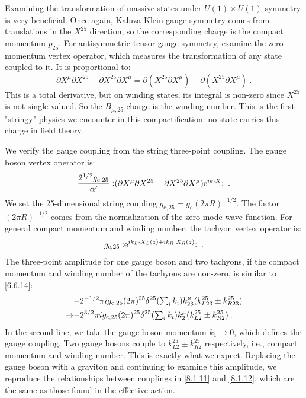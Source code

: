 Examining the transformation of massive states under $U(1) \times U(1)$ symmetry is very beneficial.
Once again, Kaluza-Klein gauge symmetry comes from translations in the $X^{25}$ direction, 
so the corresponding charge is the compact momentum $p_{25} $. For antisymmetric tensor gauge symmetry, examine the zero-momentum vertex operator, which measures the transformation of any state coupled to it.
It is proportional to:
\begin{equation}
	\partial X^{\mu} \bar{\partial} X^{25}-\partial X^{25} \bar{\partial} X^{\mu}= 
	\bar{\partial}(X^{25} \partial X^{\mu})-\partial(X^{25} \bar{\partial} X^{\mu}) \:. \label{8.3.4}
\end{equation}
This is a total derivative, but on winding states, its integral is non-zero since $X^{25}$ is not single-valued. So the $B_{\mu, 25}$ charge is the winding number.
This is the first "stringy" physics we encounter in this compactification: no state carries this charge in field theory.

We verify the gauge coupling from the string three-point coupling. The gauge boson vertex operator is:
\begin{equation}
	\frac{2^{1 / 2} g_{\mathrm{c}, 25}}{\alpha^{\prime}}:\mathrel{(\partial X^{\mu} \bar{\partial} X^{25} \pm 
		\partial X^{25} \bar{\partial} X^{\mu}) \mathrm{e}^{i k \cdot X}}: \:. \label{8.3.5}
\end{equation}
We set the 25-dimensional string coupling $g_{\mathrm{c}, 25}=g_{\mathrm{c}}(2 \pi R)^{-1 / 2}$. The factor $(2 \pi R)^{-1 / 2}$ comes from the normalization of the zero-mode wave function. 
For general compact momentum and winding number, the tachyon vertex operator is:
\begin{equation}
	g_{\mathrm{c}, 25}:\mathrel{ \mathrm{e}^{i k_{L} \cdot X_{L}(z)+i k_{R} \cdot X_{R}(\bar{z})}}: \:. \label{8.3.6}
\end{equation}
The three-point amplitude for one gauge boson and two tachyons, if the compact momentum and winding number of the tachyons are non-zero, is similar to \eqref{6.6.14}:
\begin{align}
	& {-}2^{-1 / 2} \pi i g_{\mathrm{c}, 25}(2 \pi)^{25} \delta^{25}({\textstyle\sum_{i} k_{i}}) k_{23}^{\mu}
	(k_{L 23}^{25} \pm k_{R 23}^{25}) \nonumber \\
	\to & {-}2^{3 / 2} \pi i g_{\mathrm{c}, 25}(2 \pi)^{25} \delta^{25}({\textstyle \sum_{i} k_{i}}) k_{2}^{\mu}
	(k_{L 2}^{25} \pm k_{R 2}^{25}) \:. \label{8.3.7}
\end{align}
In the second line, we take the gauge boson momentum $k_{1} \rightarrow 0$, which defines the gauge coupling. Two gauge bosons couple to $k_{L 2}^{25} \pm k_{R 2}^{25}$ respectively, i.e., compact momentum and winding number. 
This is exactly what we expect. Replacing the gauge boson with a graviton and continuing to examine this amplitude, we reproduce the relationships between couplings in \eqref{8.1.11} and \eqref{8.1.12}, which are the same as those found in the effective action.

